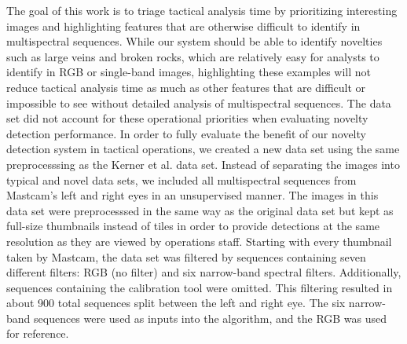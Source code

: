 The goal of this work is to triage tactical analysis time by prioritizing interesting images and highlighting features that are otherwise difficult to identify in multispectral sequences.
While our system should be able to identify novelties such as large veins and broken rocks, which are relatively easy for analysts to identify in RGB or single-band images, highlighting these examples will not reduce tactical analysis time as much as other features that are difficult or impossible to see without detailed analysis of multispectral sequences. 
The \cite{kerner2020comparison} data set did not account for these operational priorities when evaluating novelty detection performance. 
In order to fully evaluate the benefit of our novelty detection system in tactical operations, we created a new data set using the same preprocesssing as the Kerner et al. data set. 
Instead of separating the images into typical and novel data sets, we included all multispectral sequences from Mastcam's left and right eyes in an unsupervised manner.
The images in this data set were preprocesssed in the same way as the original data set but kept as full-size thumbnails instead of tiles in order to provide detections at the same resolution as they are viewed by operations staff. 
Starting with every thumbnail taken by Mastcam, the data set was filtered by sequences containing seven different filters: RGB (no filter) and six narrow-band spectral filters.
Additionally, sequences containing the calibration tool were omitted. 
This filtering resulted in about 900 total sequences split between the left and right eye. 
The six narrow-band sequences were used as inputs into the algorithm, and the RGB was used for reference.
